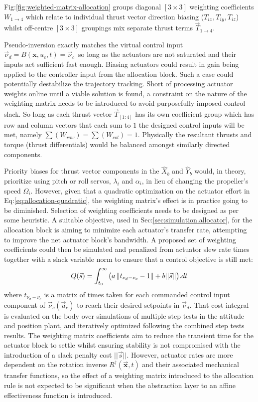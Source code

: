 \par
Fig:\ref{fig:weighted-matrix-allocation} groups diagonal $[3\times 3]$ weighting coefficients $W_{1\rightarrow 4}$ which relate to individual thrust vector direction biasing ($T_{ix},T_{iy},T_{iz}$) whilst off-centre $[3\times 3]$ groupings mix separate thrust terms $\vec{T}_{1\rightarrow 4}$. 
\par
Pseudo-inversion exactly matches the virtual control input $\vec{\nu}_d=B(\mathbf{x},u_c,t)=\vec{\nu}_c$~so long as the actuators are not saturated and their inputs act sufficient fast enough. Biasing actuators could result in gain being applied to the controller input from the allocation block. Such a case could potentially destabilize the trajectory tracking. Short of processing actuator weights online until a viable solution is found, a constraint on the nature of the weighting matrix needs to be introduced to avoid purposefully imposed control slack. So long as each thrust vector $\vec{T}_{[1:4]}$ has its own coefficient group which has row and column vectors that each sum to $1$ the designed control inputs will be met, namely $\sum (W_{row})=\sum (W_{col}) = 1$. Physically the resultant thrusts and torque (thrust differentials) would be balanced amongst similarly directed components. 
\par
Priority biases for thrust vector components in the $\hat{X}_{b}$ and $\hat{Y}_{b}$ would, in theory, prioritize using pitch or roll servos, $\lambda_i$ and $\alpha_i$, in lieu of changing the propeller's speed $\Omega_i$. However, given that a quadratic optimization on the actuator effort in Eq:\ref{eq:allocation-quadratic}, the weighting matrix's effect is in practice going to be diminished. Selection of weighting coefficients needs to be designed as per some heuristic. A suitable objective, used in Sec:\ref{sec:simulation.allocator}, for the allocation block is aiming to minimize each actuator's transfer rate, attempting to improve the net actuator block's bandwidth. A proposed set of weighting coefficients could then be simulated and penalized from actuator slew rate times together with a slack variable norm to ensure that a control objective is still met:
\begin{equation}\label{eq:actuator-penalty}
Q(\vec{s})=\int_{t_0}^{\infty} \big(a\left\lVert t_{\nu_d-\nu_c}-1\right\rVert+b||\vec{s}||\big).dt
\end{equation}
where $t_{\nu_d-\nu_c}$ is a matrix of times taken for each commanded control input component of $\vec{\nu}_c(\vec{u}_c)$ to reach their desired setpoints in $\vec{\nu}_d$. That cost integral is evaluated on the body over simulations of multiple step tests in the attitude and position plant, and iteratively optimized following the combined step tests results. The weighting matrix coefficients aim to reduce the transient time for the actuator block to settle whilst ensuring stability is not compromised with the introduction of a slack penalty cost $||\vec{s}||$. However, actuator rates are more dependent on the rotation inverse $R^\dagger(\vec{\mathbf{x}},t)$ and their associated mechanical transfer functions, so the effect of a weighting matrix introduced to the allocation rule is not expected to be significant when the abstraction layer to an affine effectiveness function is introduced.